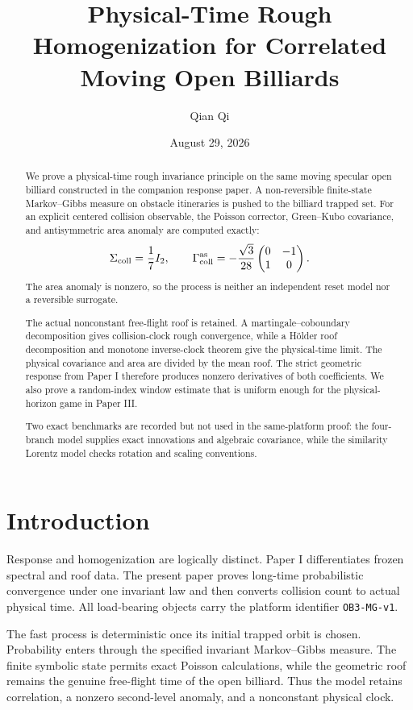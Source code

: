 \documentclass[11pt,reqno]{amsart}
\title[Physical-time rough homogenization]{Physical-Time Rough Homogenization for Correlated Moving Open Billiards}
\author{Qian Qi}
\date{August 29, 2026}
\theoremstyle{definition}
\theoremstyle{remark}
\begin{document}
\begin{abstract}
We prove a physical-time rough invariance principle on the same moving
specular open billiard constructed in the companion response paper.  A
non-reversible finite-state Markov--Gibbs measure on obstacle itineraries is
pushed to the billiard trapped set.  For an explicit centered collision
observable, the Poisson corrector, Green--Kubo covariance, and antisymmetric
area anomaly are computed exactly:
\[
 \Sigma_{\rm coll}=\frac17I_2,\qquad
 \Gamma_{\rm coll}^{\rm as}
 =-\frac{\sqrt3}{28}
 \begin{pmatrix}0&-1\\1&0\end{pmatrix}.
\]
The area anomaly is nonzero, so the process is neither an independent reset
model nor a reversible surrogate.

The actual nonconstant free-flight roof is retained.  A martingale--coboundary
decomposition gives collision-clock rough convergence, while a Hölder
roof decomposition and monotone inverse-clock theorem give the physical-time
limit.  The physical covariance and area are divided by the mean roof.
The strict geometric response from Paper I therefore produces nonzero
derivatives of both coefficients.  We also prove a random-index window
estimate that is uniform enough for the physical-horizon game in Paper III.

Two exact benchmarks are recorded but not used in the same-platform proof:
the four-branch model supplies exact innovations and algebraic covariance,
while the similarity Lorentz model checks rotation and scaling conventions.
\end{abstract}

\maketitle
\tableofcontents

\section{Introduction}

Response and homogenization are logically distinct.  Paper I differentiates
frozen spectral and roof data.  The present paper proves long-time
probabilistic convergence under one invariant law and then converts collision
count to actual physical time.  All load-bearing objects carry the platform
identifier \texttt{OB3-MG-v1}.

The fast process is deterministic once its initial trapped orbit is chosen.
Probability enters through the specified invariant Markov--Gibbs measure.
The finite symbolic state permits exact Poisson calculations, while the
geometric roof remains the genuine free-flight time of the open billiard.
Thus the model retains correlation, a nonzero second-level anomaly, and a
nonconstant physical clock.
\end{document}
